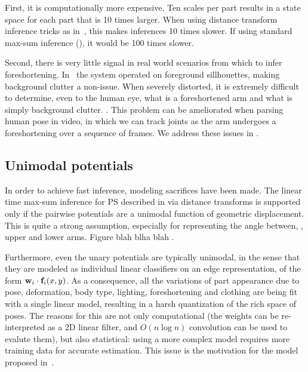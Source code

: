  First, it is computationally more expensive.  Ten scales per part results in a 
state space for each part that is 10 times larger.  When using distance 
transform inference tricks as in~, this makes inferences 10 times 
slower.  If using standard max-sum inference (), it 
would be 100 times slower.   

Second, there is very little signal in real world scenarios from which to infer 
foreshortening.  In~\citet{felz05} the system operated on foreground 
sillhouettes, making background clutter a non-issue.  When severely distorted, 
it is extremely difficult to determine, even to the human eye, what is a foreshortened arm and what is simply background clutter. .  This problem can be ameliorated when parsing human pose in video, in which we can track joints as the arm undergoes a foreshortening over a sequence of frames.  We address these issues in .

\subsection{Unimodal potentials}

In order to achieve fast inference, modeling sacrifices have been made.  The 
linear time max-sum inference for PS described in  via distance 
transforms is supported only if the pairwise potentials are a unimodal function 
of geometric displacement.  This is quite a strong assumption, especially for 
representing the angle between, \eg, upper and lower arms.  Figure blah blha 
blah . 

Furthermore, even the unary potentials are typically unimodal, in the sense 
that they are modeled as individual linear classifiers on an edge 
representation, of the form $\mathbf{w}_i \cdot \mathbf{f}_i(x,y)$.  As a consequence, all the 
variations of part appearance due to pose, deformation, body type, lighting, 
foreshortening and clothing are being fit with a single linear model, resulting 
in a harsh quantization of the rich space of poses.  The reasons for this are 
not only computational (the weights can be re-interpreted as a 2D linear 
filter, and $O(n \log n)$ convolution can be used to evalute them), but also 
statistical: using a more complex model requires more training data for 
accurate estimation.  This issue is the motivation for the model proposed 
in~.

